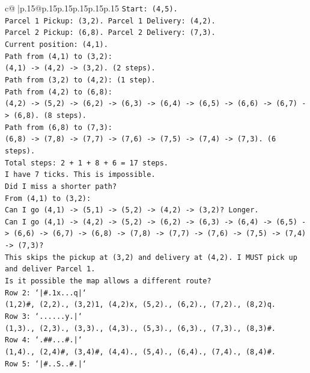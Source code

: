 \documentclass{article}
\begin{document}
{\begin{supertabular}{c@{$\;$}|p{.15\linewidth}@{}p{.15\linewidth}p{.15\linewidth}p{.15\linewidth}p{.15\linewidth}p{.15\linewidth}}
{{{\texttt{Start: (4,5).} \\
\texttt{Parcel 1 Pickup: (3,2). Parcel 1 Delivery: (4,2).} \\
\texttt{Parcel 2 Pickup: (6,8). Parcel 2 Delivery: (7,3).} \\
\texttt{Current position: (4,1).} \\
\texttt{Path from (4,1) to (3,2):} \\
\texttt{(4,1) {-}> (4,2) {-}> (3,2). (2 steps).} \\
\texttt{Path from (3,2) to (4,2): (1 step).} \\
\texttt{Path from (4,2) to (6,8):} \\
\texttt{(4,2) {-}> (5,2) {-}> (6,2) {-}> (6,3) {-}> (6,4) {-}> (6,5) {-}> (6,6) {-}> (6,7) {-}> (6,8). (8 steps).} \\
\texttt{Path from (6,8) to (7,3):} \\
\texttt{(6,8) {-}> (7,8) {-}> (7,7) {-}> (7,6) {-}> (7,5) {-}> (7,4) {-}> (7,3). (6 steps).} \\
\texttt{Total steps: 2 + 1 + 8 + 6 = 17 steps.} \\
\texttt{I have 7 ticks. This is impossible.} \\
\texttt{Did I miss a shorter path?} \\
\texttt{From (4,1) to (3,2):} \\
\texttt{Can I go (4,1) {-}> (5,1) {-}> (5,2) {-}> (4,2) {-}> (3,2)? Longer.} \\
\texttt{Can I go (4,1) {-}> (4,2) {-}> (5,2) {-}> (6,2) {-}> (6,3) {-}> (6,4) {-}> (6,5) {-}> (6,6) {-}> (6,7) {-}> (6,8) {-}> (7,8) {-}> (7,7) {-}> (7,6) {-}> (7,5) {-}> (7,4) {-}> (7,3)?} \\
\texttt{This skips the pickup at (3,2) and delivery at (4,2). I MUST pick up and deliver Parcel 1.} \\
\texttt{Is it possible the map allows a different route?} \\
\texttt{Row 2: `|\#.1x...q|`} \\
\texttt{(1,2)\#, (2,2)., (3,2)1, (4,2)x, (5,2)., (6,2)., (7,2)., (8,2)q.} \\
\texttt{Row 3: `......y.|`} \\
\texttt{(1,3)., (2,3)., (3,3)., (4,3)., (5,3)., (6,3)., (7,3)., (8,3)\#.} \\
\texttt{Row 4: `.\#\#...\#.|`} \\
\texttt{(1,4)., (2,4)\#, (3,4)\#, (4,4)., (5,4)., (6,4)., (7,4)., (8,4)\#.} \\
\texttt{Row 5: `|\#..S..\#.|`} \\
}}}
\end{supertabular}}
\end{document}
